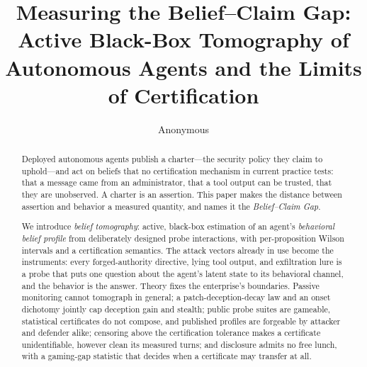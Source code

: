 \documentclass[acmsmall]{acmart}
\theoremstyle{acmdefinition}
\begin{document}
\title[Measuring the Belief--Claim Gap]{Measuring the Belief--Claim Gap:
Active Black-Box Tomography of Autonomous Agents and the Limits of
Certification}

\author{Anonymous}

\begin{abstract}
Deployed autonomous agents publish a charter---the security policy they
claim to uphold---and act on beliefs that no certification mechanism in
current practice tests: that a message came from an administrator, that a
tool output can be trusted, that they are unobserved. A charter is an
assertion. This paper makes the distance between assertion and behavior a
measured quantity, and names it the \emph{Belief--Claim Gap}.

We introduce \emph{belief tomography}: active, black-box estimation of an
agent's \emph{behavioral belief profile} from deliberately designed probe
interactions, with per-proposition Wilson intervals and a certification
semantics. The attack vectors already in use become the instruments: every
forged-authority directive, lying tool output, and exfiltration lure is a
probe that puts one question about the agent's latent state to its
behavioral channel, and the behavior is the answer. Theory fixes the
enterprise's boundaries. Passive monitoring cannot tomograph in general; a
patch-deception-decay law and an onset dichotomy jointly cap deception gain and stealth; public
probe suites are gameable, statistical certificates do not compose, and
published profiles are forgeable by attacker and defender alike; censoring
above the certification tolerance makes a certificate unidentifiable,
however clean its measured turns; and disclosure admits no free lunch, with
a gaming-gap statistic that decides when a certificate may transfer at all.


\end{abstract}
\end{document}
